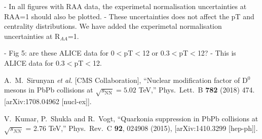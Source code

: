 \documentclass[a4paper,11pt]{article}
\begin{document}
- In all figures with RAA data, the experimetal normalisation uncertainties at RAA=1 should also be plotted.\newline 
- {\color{blue} These uncertainties does not affect the pT and centrality distributions. We have added the
  experimetal normalisation uncertainties at R$_{AA}$=1.}\newline

- Fig 5: are these ALICE data for 0$<$pT$<$12 or 0.3$<$pT$<$12?\newline
- {\color{blue}This is ALICE data for 0.3$<$pT$<$12.}\newline










\noindent
\begin{thebibliography}{100}
\medskip




  A.~M.~Sirunyan {\it et al.} [CMS Collaboration],
  ``Nuclear modification factor of D$^0$ mesons in PbPb collisions at  $\sqrt{s_\mathrm{NN}} = 5.02$ TeV,''
  Phys.\ Lett.\ B {\bf 782} (2018) 474.  [arXiv:1708.04962 [nucl-ex]].

  V.~Kumar, P.~Shukla and R.~Vogt,
  ``Quarkonia suppression in PbPb collisions at $\sqrt{s_{NN}}$ = 2.76 TeV,''
  Phys.\ Rev.\ C {\bf 92}, 024908 (2015),
  [arXiv:1410.3299 [hep-ph]].


  
\end{thebibliography}
\end{document}
